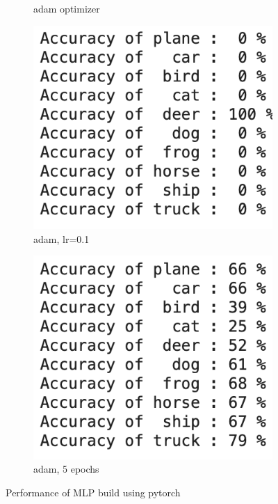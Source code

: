 \documentclass[a4 paper]{article}
\begin{document}
\begin{figure}[h!]
\begin{subfigure}{.244\textwidth}
      \caption{adam optimizer}
      \label{fig:sub2}
    \end{subfigure}
    \begin{subfigure}{.244\textwidth}
        \centering
        \includegraphics[width=1\linewidth]{images/q9_7.png}
        \caption{adam, lr=0.1}
        \label{fig:sub1}
      \end{subfigure}%
      \begin{subfigure}{.244\textwidth}
        \centering
        \includegraphics[width=1\linewidth]{images/q9_8.png}
        \caption{adam, 5 epochs}
        \label{fig:sub2}
      \end{subfigure}
    \caption{Performance of MLP build using pytorch}
    \label{fig:test}
\end{figure}
\end{document}
